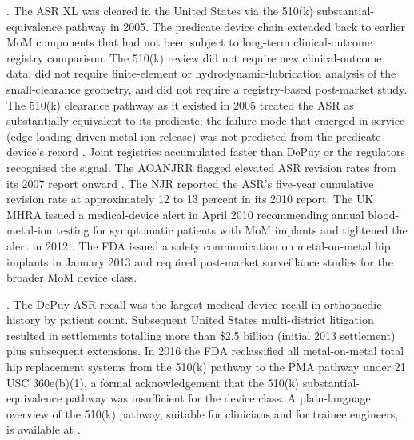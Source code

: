 . The ASR XL was cleared in
the United States via the 510(k) substantial-equivalence pathway
in 2005. The predicate device chain extended back to earlier MoM
components that had not been subject to long-term clinical-outcome
registry comparison. The 510(k) review did not require new
clinical-outcome data, did not require finite-element or
hydrodynamic-lubrication analysis of the small-clearance geometry,
and did not require a registry-based post-market study. The 510(k)
clearance pathway as it existed in 2005 treated the ASR as
substantially equivalent to its predicate; the failure mode that
emerged in service (edge-loading-driven metal-ion release) was not
predicted from the predicate device's record
\cite{paper:v6c12-cohen-mom-bmj-2012,
paper:v6c12-zaaijer-510k-2013}. Joint registries accumulated faster
than DePuy or the regulators recognised the signal. The AOANJRR
flagged elevated ASR revision rates from its 2007 report onward
\cite{web:v6c12-aoanjrr-2023}. The NJR reported the ASR's five-year
cumulative revision rate at approximately 12 to 13 percent in its
2010 report. The UK MHRA issued a medical-device alert in April 2010
recommending annual blood-metal-ion testing for symptomatic patients
with MoM implants and tightened the alert in 2012
\cite{web:v6c12-mhra-mom-2012}. The FDA issued a safety
communication on metal-on-metal hip implants in January 2013
\cite{web:v6c12-fda-mom-orthopaedic-2013} and required post-market
surveillance studies for the broader MoM device class.

. The DePuy ASR recall was the
largest medical-device recall in orthopaedic history by patient
count. Subsequent United States multi-district litigation resulted
in settlements totalling more than \$2.5 billion (initial 2013
settlement) plus subsequent extensions. In 2016 the FDA
reclassified all metal-on-metal total hip replacement systems from
the 510(k) pathway to the PMA pathway under 21 USC 360e(b)(1), a
formal acknowledgement that the 510(k) substantial-equivalence
pathway was insufficient for the device class. A plain-language
overview of the 510(k) pathway, suitable for clinicians and for
trainee engineers, is available at
\cite{web:v6c12-ahrq-pcori-510k-explained-2018}.


